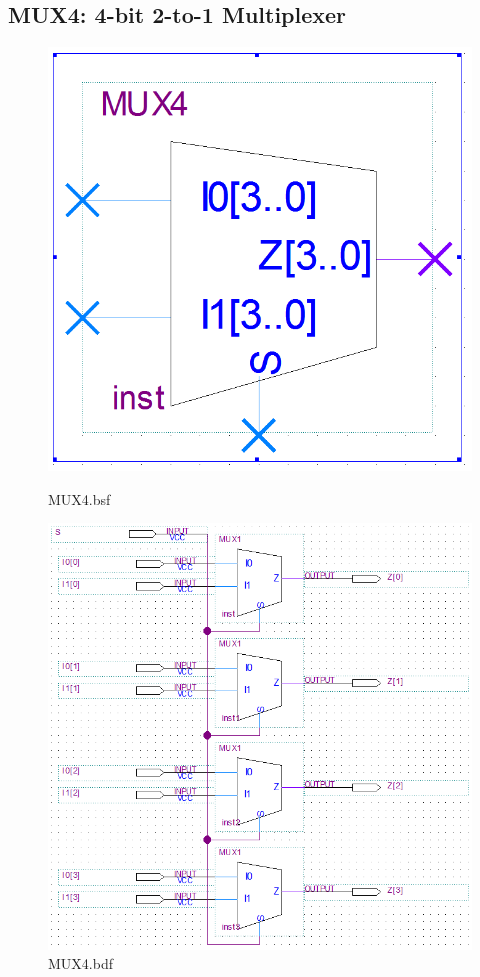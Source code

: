 \documentclass[12pt,a4paper]{article}
\begin{document}
  \subsection{MUX4: 4-bit 2-to-1 Multiplexer}
  \begin{figure}[H]
    \centering
    \begin{subcaptionblock}{0.19\linewidth}
      \includegraphics[width=\linewidth]{Lab2_2/MUX4_bsf.png}
      \caption{MUX4.bsf}
    \end{subcaptionblock}
    \begin{subcaptionblock}{0.8\linewidth}
      \includegraphics[width=\linewidth]{Lab2_2/MUX4_bdf.png}
      \caption{MUX4.bdf}
    \end{subcaptionblock}
  \end{figure}
\end{document}
